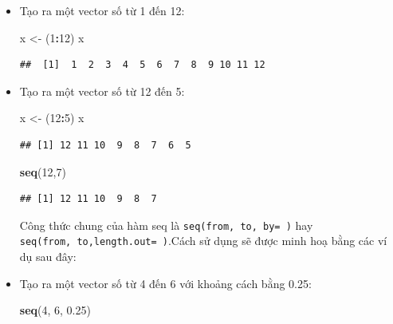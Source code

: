 \documentclass[
]{book}
\newenvironment{Shaded}{\begin{snugshade}}{\end{snugshade}}
\newcommand{\DecValTok}[1]{\textcolor[rgb]{0.00,0.00,0.81}{#1}}
\newcommand{\FloatTok}[1]{\textcolor[rgb]{0.00,0.00,0.81}{#1}}
\newcommand{\KeywordTok}[1]{\textcolor[rgb]{0.13,0.29,0.53}{\textbf{#1}}}
\newcommand{\NormalTok}[1]{#1}
\newcommand{\OperatorTok}[1]{\textcolor[rgb]{0.81,0.36,0.00}{\textbf{#1}}}
\newcommand{\StringTok}[1]{\textcolor[rgb]{0.31,0.60,0.02}{#1}}
\begin{document}
\begin{itemize}
\item
  Tạo ra một vector số từ 1 đến 12:

\begin{Shaded}
\begin{Highlighting}[]
\NormalTok{x \textless{}{-}}\StringTok{ }\NormalTok{(}\DecValTok{1}\OperatorTok{:}\DecValTok{12}\NormalTok{)}
\NormalTok{x}
\end{Highlighting}
\end{Shaded}

\begin{verbatim}
##  [1]  1  2  3  4  5  6  7  8  9 10 11 12
\end{verbatim}
\item
  Tạo ra một vector số từ 12 đến 5:

\begin{Shaded}
\begin{Highlighting}[]
\NormalTok{x \textless{}{-}}\StringTok{ }\NormalTok{(}\DecValTok{12}\OperatorTok{:}\DecValTok{5}\NormalTok{)}
\NormalTok{x}
\end{Highlighting}
\end{Shaded}

\begin{verbatim}
## [1] 12 11 10  9  8  7  6  5
\end{verbatim}

\begin{Shaded}
\begin{Highlighting}[]
\KeywordTok{seq}\NormalTok{(}\DecValTok{12}\NormalTok{,}\DecValTok{7}\NormalTok{)}
\end{Highlighting}
\end{Shaded}

\begin{verbatim}
## [1] 12 11 10  9  8  7
\end{verbatim}

  Công thức chung của hàm seq là \texttt{seq(from,\ to,\ by=\ )} hay \texttt{seq(from,\ to,length.out=\ )}.Cách sử dụng sẽ được minh hoạ bằng các ví dụ sau đây:
\item
  Tạo ra một vector số từ 4 đến 6 với khoảng cách bằng 0.25:

\begin{Shaded}
\begin{Highlighting}[]
\KeywordTok{seq}\NormalTok{(}\DecValTok{4}\NormalTok{, }\DecValTok{6}\NormalTok{, }\FloatTok{0.25}\NormalTok{)}
\end{Highlighting}
\end{Shaded}


\end{itemize}
\end{document}
